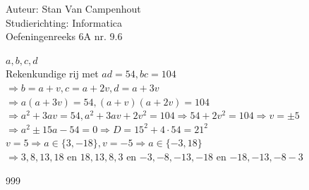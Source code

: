 \documentclass[a4paper]{article}
\begin{document}
  
\noindent \large Auteur: Stan Van Campenhout \\
\noindent \large Studierichting:  Informatica\\
\noindent \large Oefeningenreeks 6A nr. 9.6\\

\medskip

\normalsize

$ a, b, c, d $\\

Rekenkundige rij met $ ad = 54, bc = 104 $\\

$ \Rightarrow b = a + v, c = a + 2v, d = a + 3v $\\

$ \Rightarrow a\left(a + 3v\right) = 54, \left(a+v\right)\left(a+2v\right) = 104 $\\

$ \Rightarrow a^2 + 3av = 54, a^2 + 3av + 2v^2 = 104 \Rightarrow 54 + 2v^2 = 104 \Rightarrow v = \pm 5 $\\

$ \Rightarrow a^2 \pm 15a - 54 = 0 \Rightarrow D = 15^2 + 4\cdot 54 = 21^2 $\\

$ v = 5 \Rightarrow a \in \{3, -18\}, v = -5 \Rightarrow a \in \{-3, 18\} $\\

$ \Rightarrow 3, 8, 13, 18 $  en $ 18, 13, 8, 3 $ en $ -3, -8 ,-13, -18 $ en $ -18, -13, -8 -3 $\\

\begin{thebibliography}{999}
\end{thebibliography}
\end{document}
